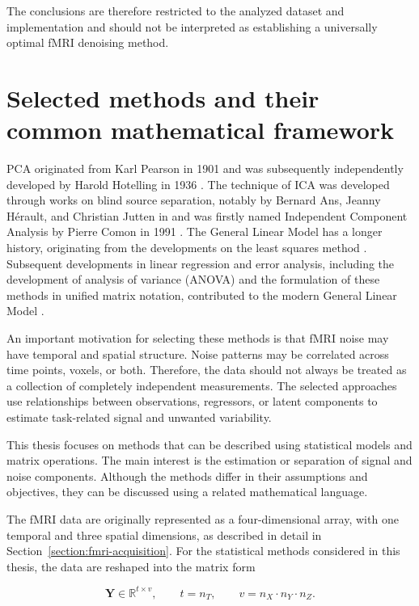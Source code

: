 \documentclass[english]{pwr_wmat_praca_dyplomowa}
\theoremstyle{definition}
\theoremstyle{remark}
\begin{document}
The conclusions are therefore restricted to the analyzed dataset and implementation and should not be interpreted as establishing a universally optimal fMRI denoising method.


\section{Selected methods and their common mathematical framework}

PCA originated from Karl Pearson in 1901 \cite{pca-first} and was subsequently independently developed by Harold Hotelling in 1936 \cite{pca-second}. The technique of ICA was developed through works on blind source separation, notably by Bernard Ans, Jeanny H\'{e}rault, and Christian Jutten in \cite{ica-first} and was firstly named Independent Component Analysis by Pierre Comon in 1991 \cite{ica-second}. The General Linear Model has a longer history, originating from the developments on the least squares method \cite{glm-ls}. Subsequent developments in linear regression and error analysis, including the development of analysis of variance (ANOVA) and the formulation of these methods in unified matrix notation, contributed to the modern General Linear Model \cite{glm-ls}.

An important motivation for selecting these methods is that fMRI noise may have temporal and spatial structure. Noise patterns may be correlated across time points, voxels, or both. Therefore, the data should not always be treated as a collection of completely independent measurements. The selected approaches use relationships between observations, regressors, or latent components to estimate task-related signal and unwanted variability.

This thesis focuses on methods that can be described using statistical models and matrix operations. The main interest is the estimation or separation of signal and noise components. Although the methods differ in their assumptions and objectives, they can be discussed using a related mathematical language.

The fMRI data are originally represented as a four-dimensional array, with one temporal and three spatial dimensions, as described in detail in Section~\ref{section:fmri-acquisition}. For the statistical methods considered in this thesis, the data are reshaped into the matrix form

\begin{equation}
    \mathbf{Y} \in \mathbb{R}^{t \times v}, \qquad t = n_T, \qquad v = n_X \cdot n_Y \cdot n_Z.
\end{equation}
\end{document}
